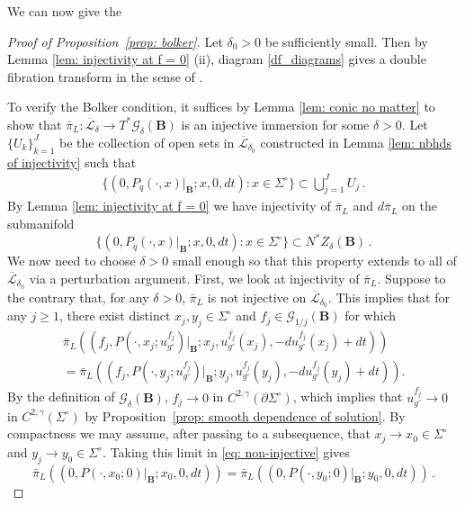 \documentclass[11pt]{amsart}
\theoremstyle{definition}
\numberwithin{equation}{section}
\newcommand{\G}{\mathcal G}
\newcommand{\BB}{\mathbf B}
\begin{document}
We can now give the 
\begin{proof}[Proof of Proposition~\ref{prop: bolker}]



Let $\delta_0>0$ be sufficiently small. Then by Lemma \ref{lem: injectivity at f = 0} (ii), diagram \eqref{df_diagrams} gives a double fibration transform in the sense of \cite{MST}.

To verify the Bolker condition, it suffices by Lemma \ref{lem: conic no matter} to show that $\bar\pi_L : \overline{\mathcal L}_{\delta} \to T^* \mathcal G_{\delta}(\BB)$ is an injective immersion for some $\delta>0$. Let $\{U_k\}_{k=1}^J$ be the collection of open sets in $\overline{\mathcal L}_{\delta_0}$ constructed in Lemma \ref{lem: nbhds of injectivity} such that
\begin{eqnarray}
\label{eq: in the union}
\{(0, P_q(\cdot, x)\vert_\BB; x, 0, dt)\colon x\in \Sigma^\circ\} \subset \bigcup_{j=1}^J U_j\,.
\end{eqnarray}
By Lemma \ref{lem: injectivity at f = 0} we have injectivity of $\bar \pi_L$ and $d\bar \pi_L$ on the submanifold
\[
	\{(0, P_q(\cdot, x)\vert_\BB; x, 0, dt)\colon x\in \Sigma^\circ\}\subset N^*Z_\delta(\BB)\,.
\]
We now need to choose $\delta>0$ small enough so that this property extends to all of $\overline{\mathcal L}_{\delta_0}$ via a perturbation argument. First, we look at injectivity of $\bar\pi_L$. Suppose to the contrary that, for any $\delta>0$, $\bar\pi_L$ is not injective on $\overline{\mathcal L}_{\delta_0}$. This implies that for any $j \geq 1$, there exist distinct $x_j,y_j\in\Sigma^\circ$ and $f_j\in \G_{1/j}(\BB)$ for which 
\begin{multline}\label{eq: non-injective}
\bar \pi_L\left((f_j, P(\cdot, x_j; u_{g^\circ}^{f_j})\vert_{\BB} ;x_j, u_{g^\circ}^{f_j} (x_j), -du_{g^\circ}^{f_j}(x_j) + dt )\right) \\
 = \bar\pi_L\left((f_j, P(\cdot, y_j; u_{g^\circ}^{f_j})\vert_{\BB} ;y_j, u_{g^\circ}^{f_j} (y_j), -du_{g^\circ}^{f_j}(y_j) + dt ) \right).
\end{multline}
By the definition of $\G_\delta(\BB)$, $f_j\to 0$ in $C^{2,\gamma}(\partial\Sigma^\circ)$, which implies that $u^{f_j}_{g^\circ} \to 0$ in $C^{2,\gamma}(\Sigma^\circ)$ by Proposition~\ref{prop: smooth dependence of solution}. By compactness we may assume, after passing to a subsequence, that $x_j\to x_0\in \Sigma^\circ$ and $y_j\to y_0\in \Sigma^\circ$. Taking this limit in \eqref{eq: non-injective} gives 
\[
	\bar\pi_L\left((0, P(\cdot,x_0; 0)\vert_{\BB} ;x_0, 0,  dt )\right) = \bar\pi_L\left((0, P(\cdot, y_0; 0)\vert_{\BB} ;y_0, 0,  dt ) \right)\,.
\]
\end{proof}
\end{document}

